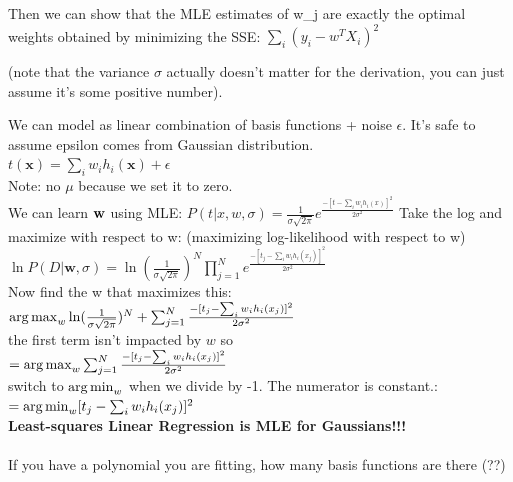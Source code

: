 Then we can show that the MLE estimates of w_j are exactly the optimal weights obtained by minimizing the SSE: $\sum_i (y_i - w^T X_i)^2$

(note that the variance $\sigma$ actually doesn't matter for the derivation, you can just assume it's some positive number).

We can model as linear combination of basis functions + noise $\epsilon$.  
It's safe to assume epsilon comes from Gaussian distribution.  \hfill \\

$t(\bm{x}) = \sum_i w_i h_i(\bm{x}) + \epsilon $ \hfill \\
Note: no $\mu$ because we set it to zero.  \hfill \\

We can learn $\bf{w}$ using MLE: 
$P(t | x, w, \sigma) = \frac{1}{\sigma \sqrt{2 \pi}} e^\frac{-[t - \sum_i w_i h_i(x)]^2}{2 \sigma^2}$
Take the log and maximize with respect to w:  (maximizing log-likelihood with respect to w) \hfill \\
$\displaystyle \ln P(D | \bm{w}, \sigma) = \ln(\frac{1}{\sigma \sqrt{2 \pi}})^N \prod_{j=1}^N e^\frac{-[t_j - \sum_i w_i h_i(x_j)]^2}{2 \sigma^2}$ \hfill \\
Now find the w that maximizes this: \hfill \\
$\operatorname*{arg\,max}_w \ln(\frac{1}{\sigma \sqrt{2 \pi}})^N + \sum_{j=1}^N \frac{-[t_j - \sum_i w_i h_i(x_j)]^2}{2 \sigma^2}$ \hfill \\
the first term isn't impacted by $w$ so  \hfill \\
$= \operatorname*{arg\,max}_w  \sum_{j=1}^N \frac{-[t_j - \sum_i w_i h_i(x_j)]^2}{2 \sigma^2}$ \hfill \\
switch to $\operatorname*{arg\,min}_w$ when we divide by -1.  The numerator is constant.:  \hfill \\
$= \operatorname*{arg\,min}_w  [t_j - \sum_i w_i h_i(x_j)]^2 $ \hfill \\

\textbf{Least-squares Linear Regression is MLE for Gaussians!!!}  \hfill \\ \hfill \\

If you have a polynomial you are fitting, how many basis functions are there (??)  \hfill \\ %


